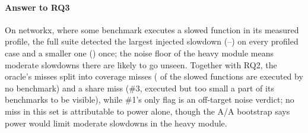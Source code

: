 \paragraph*{Answer to RQ3}
On networkx, where some benchmark executes a slowed function in its measured profile, the full suite detected the largest injected slowdown (\SlowTwoRatioLo--\SlowTwoRatioHi\x) on every profiled case and a smaller one (\SlowEightRatio\x) once; the noise floor of the heavy module means moderate slowdowns there are likely to go unseen.
Together with RQ2, the oracle's misses split into coverage misses (\SlowUnreachedProfile{} of the \NumSlowdowns{} slowed functions are executed by no benchmark) and a share miss (\#3, executed but too small a part of its benchmarks to be visible), while \#1's only flag is an off-target noise verdict; no miss in this set is attributable to power alone, though the A/A bootstrap says power would limit moderate slowdowns in the heavy module.
